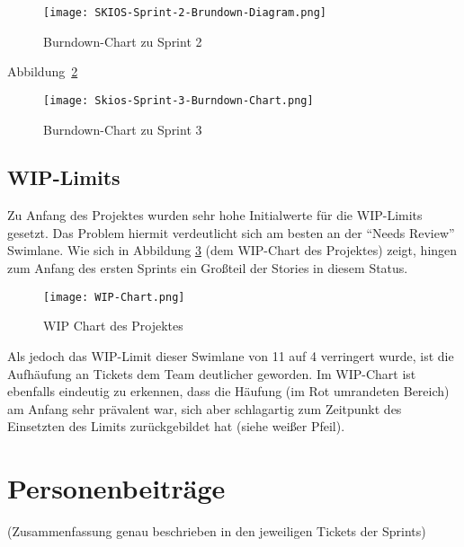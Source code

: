 \begin{figure}[H]
    \texttt{[image: SKIOS-Sprint-2-Brundown-Diagram.png]}
    \caption{Burndown-Chart zu Sprint 2}
    \label{fig:SKIOS-Sprint-2-Burndown}
\end{figure}

Abbildung~\ref{fig:SKIOS-Sprint-3-Burndown}
\begin{figure}
    \texttt{[image: Skios-Sprint-3-Burndown-Chart.png]}
    \caption{Burndown-Chart zu Sprint 3}
    \label{fig:SKIOS-Sprint-3-Burndown}
\end{figure}

\subsection{WIP-Limits}
Zu Anfang des Projektes wurden sehr hohe Initialwerte für die \ac{WIP}-Limits gesetzt.
Das Problem hiermit verdeutlicht sich am besten an der \enquote{Needs Review} Swimlane.
Wie sich in Abbildung \ref{fig:WIP} (dem \ac{WIP}-Chart des Projektes) zeigt, hingen zum Anfang des ersten Sprints ein Großteil der Stories in diesem Status.

\begin{figure}
    \centering
    \texttt{[image: WIP-Chart.png]}
    \caption{WIP Chart des Projektes}
    \label{fig:WIP}
\end{figure}

Als jedoch das \ac{WIP}-Limit dieser Swimlane von 11 auf 4 verringert wurde, ist die Aufhäufung an Tickets dem Team deutlicher geworden.
Im \ac{WIP}-Chart ist ebenfalls eindeutig zu erkennen, dass die Häufung (im Rot umrandeten Bereich) am Anfang sehr prävalent war, sich aber schlagartig zum Zeitpunkt des Einsetzten des Limits zurückgebildet hat (siehe weißer Pfeil).

\section{Personenbeiträge}
(Zusammenfassung genau beschrieben in den jeweiligen Tickets der Sprints)
